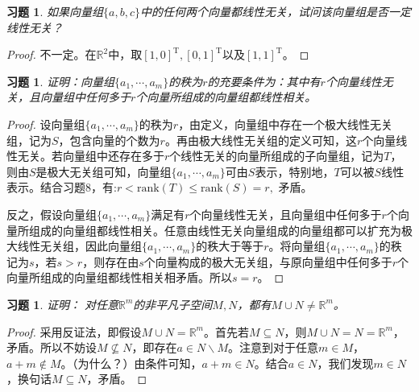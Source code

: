 \documentclass[UTF8]{ctexart}
\newtheorem{ex}[thm]{习题}
\begin{document}
\begin{ex}
如果向量组$\{a, b, c\}$中的任何两个向量都线性无关，试问该向量组是否一定线性无关？
\end{ex}
\begin{proof}
不一定。在$\mathbb{R}^2$中，取$[1,0]^{\mathrm{T}}, [0,1]^{\mathrm{T}}$以及$[1,1]^{\mathrm{T}}$。
\end{proof}



\begin{ex}
证明：向量组$\{a_1, \cdots, a_m\}$的秩为$r$的充要条件为：其中有$r$个向量线性无关，且向量组中任何多于$r$个向量所组成的向量组都线性相关。
\end{ex}
\begin{proof}
设向量组$\{a_1, \cdots, a_m\}$的秩为$r$，由定义，向量组中存在一个极大线性无关组，记为$S$，包含向量的个数为$r$。再由极大线性无关组的定义可知，这$r$个向量线性无关。若向量组中还存在多于$r$个线性无关的向量所组成的子向量组，记为$T$，则由$S$是极大无关组可知，向量组$\{a_1, \cdots, a_m\}$可由$S$表示，特别地，$T$可以被$S$线性表示。结合习题8，有:$
r < \mathrm{rank}(T) \leq \mathrm{rank}(S) = r,$ 矛盾。
\

反之，假设向量组$\{a_1, \cdots, a_m\}$满足有$r$个向量线性无关，且向量组中任何多于$r$个向量所组成的向量组都线性相关。任意由线性无关向量组成的向量组都可以扩充为极大线性无关组，因此向量组$\{a_1, \cdots, a_m\}$的秩大于等于$r$。将向量组$\{a_1, \cdots, a_m\}$的秩记为$s$，若$s > r$，则存在由$s$个向量构成的极大无关组，与原向量组中任何多于$r$个向量所组成的向量组都线性相关相矛盾。所以$s = r$。
\end{proof}




\begin{ex}
证明： 对任意$\mathbb{R}^m$的非平凡子空间$M, N$，都有$M \cup N \neq \mathbb{R}^m$。
\end{ex}
\begin{proof}
采用反证法，即假设$M \cup N = \mathbb{R}^m$。首先若$M \subseteq N$，则$M \cup N = N = \mathbb{R}^m$，矛盾。所以不妨设$M \nsubseteq N$，即存在$a \in N \backslash M$。注意到对于任意$m \in M$，$a+m \notin M$。（为什么？）由条件可知，$a+m \in N$。结合$a \in N$，我们发现$m \in N$，换句话$M \subseteq N$，矛盾。
\end{proof}
\end{document}
